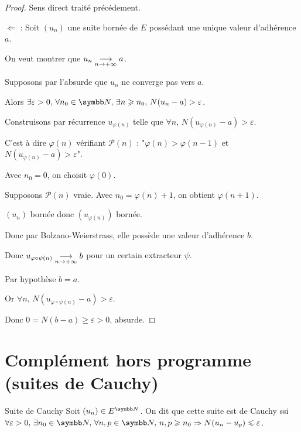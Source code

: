 
\begin{proof}
    Sens direct traité précédement. 

    $\Leftarrow$ : Soit $(u_n)$ une suite bornée de $E$ possédant une unique valeur d'adhérence $a$.

    On veut montrer que $u_n \underset{n \to +\infty}{\longrightarrow} a$.

    Supposons par l'absurde que $u_n$ ne converge pas vers $a$.

    Alors $\exists \varepsilon > 0, \, \forall n_0 \in \N, \, \exists n \geqslant n_0, \, N(u_n - a) > \varepsilon$.

    Construisons par récurrence $u_{\varphi(n)}$ telle que $\forall n, \, N(u_{\varphi(n)} - a) > \varepsilon$.

    C'est à dire $\varphi(n) $ vérifiant $\mathscr P(n)$ : "$\varphi(n) > \varphi(n - 1)$ et $N(u_{\varphi(n)} - a) > \varepsilon$".

    Avec $n_0 = 0$, on choisit $\varphi(0)$.

    Supposons $\mathscr P(n)$ vraie. Avec $n_0 = \varphi(n) + 1$, on obtient $\varphi(n + 1)$.

    $(u_n)$ bornée donc $(u_{\varphi(n)})$ bornée.

    Donc par Bolzano-Weierstrass, elle possède une valeur d'adhérence $b$.

    Donc $u_{\varphi \circ \psi(n)} \underset{n \to +\infty}{\longrightarrow} b$ pour un certain extracteur $\psi$.

    Par hypothèse $b = a$. 

    Or $\forall n, \, N(u_{\varphi \circ \psi(n)} - a) > \varepsilon$.

    Donc $ 0 = N(b - a) \geqslant \varepsilon > 0$, absurde. 
\end{proof}

\section{Complément hors programme (suites de Cauchy)}

\begin{definition}{Suite de Cauchy}{}
    Soit $(u_n) \in E^{\N}$. On dit que cette suite est de Cauchy ssi 
    $\forall \varepsilon > 0, \, \exists n_0 \in \N, \, \forall n, p \in \N, \, n, p \geqslant n_0 \Rightarrow N(u_n - u_p) \leqslant \varepsilon$.
\end{definition}

